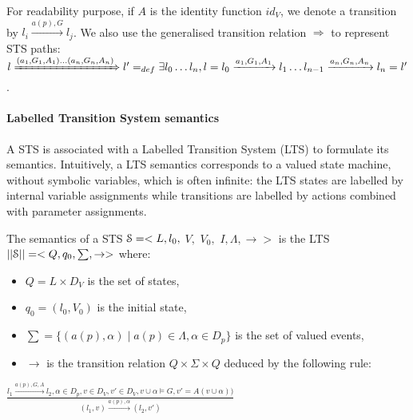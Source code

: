 For readability purpose, if $A$ is the identity function $id_V$,
we denote a transition by $l_i \xrightarrow{a(p),G} l_j$. We
also use the generalised transition relation $\Rightarrow$ to
represent STS paths: $l \xRightarrow{(a_1,G_1,A_1)\dots
(a_n,G_n,A_n)} l' =_{def} \exists l_0\dots l_n, l=l_0
\xrightarrow{a_1,G_1,A_1} l_1\dots
l_{n-1}\xrightarrow{a_n,G_n,A_n}l_n=l'$.

\paragraph{Labelled Transition System semantics}
\label{sec:definitions:lts-semantics}

A STS is associated with a Labelled Transition System (LTS) to
formulate its semantics. Intuitively, a LTS semantics corresponds
to a valued state machine, without symbolic variables, which is
often infinite: the LTS states are labelled by internal variable
assignments while transitions are labelled by actions combined
with parameter assignments.

\begin{definition}
    The semantics of a STS $\EuScript{S}=<L,l_0,$ $V,$ $V_0,$
    $I,\Lambda,\rightarrow>$ is the LTS
    $||\EuScript{S}||=<Q,q_0,\sum,\rightarrow>$ where:

	\begin{itemize}

		\item $Q=L \times D_V$ is the set of states,

        \item $q_0=(l_0,V_0)$ is the initial state,

		\item $\sum=\{(a(p),\alpha)  \mid  a(p)\in\Lambda, \alpha \in
		D_p\}$ is the set of valued events,

        \item $\rightarrow$ is the transition relation $Q \times
        \Sigma \times Q$ deduced by the following rule:\\
	\end{itemize}
	\begin{center}
    $\frac{l_1 \xrightarrow{a(p),G,A}l_2,\alpha \in D_p, v \in D_V, v'
        \in D_V, v \cup \alpha \models G, v'=A(v \cup \alpha))}{(l_1,v)
            \xrightarrow{a(p),\alpha} (l_2,v') }$
	\end{center}

	\label{def:semantics}
\end{definition}

